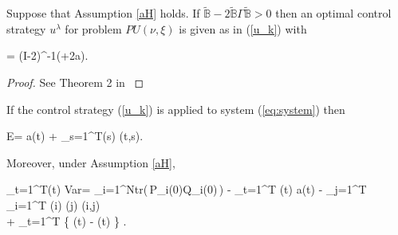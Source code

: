 \begin{theorem} \label{t:lambda}
	Suppose that Assumption \ref{aH} holds. If $ \tilde{\mathbb{B}} - 2 
	\tilde{\mathbb{B}} \Gamma 	
	\tilde{\mathbb{B}} > 0$ then an optimal control strategy $u^{\lambda}$ for 
	problem 	
	$PU(\nu,\xi)$ is given as in (\ref{u_k}) with
	\begin{flalign} \label{PU:lambda}
		\lambda = (I-2\Gamma{})^{-1}(\xi+2\Gamma a).
	\end{flalign}
\end{theorem}

\begin{proof}
	See Theorem 2 in \cite{alexandre}
\end{proof}

\begin{prop} \label{p:SVar}
	If the control strategy (\ref{u_k}) is applied to system (\ref{eq:system}) 
	then
	\begin{flalign} \label{eq:E_y}
		 E\bigl[ y^{u}(t) \bigr]= a(t) + \sum_{s=1}^{T}\lambda(s)
		 (t,s).
	\end{flalign}

	Moreover, under Assumption \ref{aH},
	\begin{flalign} \label{eq:Svar}
		\sum_{t=1}^{T}\nu(t) Var\big[ y^{u}(t) \big] = 	
		\sum_{i=1}^{N}tr(\,P_{i}(0)Q_{i}(0)\,)
		- \sum_{t=1}^{T} \lambda(t) a(t) -  \sum_{j=1}^{T} 
		\sum_{i=1}^{T} \lambda(i) \lambda(j) (i,j)   \nonumber \\
		+ \sum_{t=1}^{T} \left\{ \lambda(t) - \nu(t) \left[ a(t) + 		
		\sum_{s=1}^{T}\lambda(s)\tilde{b}(t,s) \right] \right\}
		 \left[ a(t) + \sum_{s=1}^{T}\lambda(s)\tilde{b}(t,s) \right].
	\end{flalign}
\end{prop}

